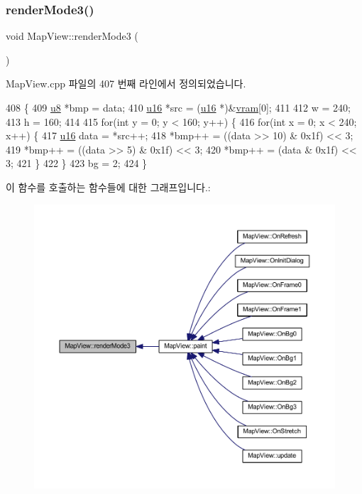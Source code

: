 \subsubsection{\texorpdfstring{render\+Mode3()}{renderMode3()}}
{\footnotesize\ttfamily void Map\+View\+::render\+Mode3 (\begin{DoxyParamCaption}{ }\end{DoxyParamCaption})}



Map\+View.\+cpp 파일의 407 번째 라인에서 정의되었습니다.


\begin{DoxyCode}
408 \{
409   \mbox{\hyperlink{_system_8h_aed742c436da53c1080638ce6ef7d13de}{u8}} *bmp = data;
410   \mbox{\hyperlink{_system_8h_a9e6c91d77e24643b888dbd1a1a590054}{u16}} *src = (\mbox{\hyperlink{_system_8h_a9e6c91d77e24643b888dbd1a1a590054}{u16}} *)&\mbox{\hyperlink{_globals_8cpp_a983f8cd19ae66ea98e180c2e13bee5b9}{vram}}[0];
411 
412   w = 240;
413   h = 160;
414   
415   \textcolor{keywordflow}{for}(\textcolor{keywordtype}{int} y = 0; y < 160; y++) \{
416     \textcolor{keywordflow}{for}(\textcolor{keywordtype}{int} x = 0; x < 240; x++) \{
417       \mbox{\hyperlink{_system_8h_a9e6c91d77e24643b888dbd1a1a590054}{u16}} data = *src++;
418       *bmp++ = ((data >> 10) & 0x1f) << 3;
419       *bmp++ = ((data >> 5) & 0x1f) << 3;
420       *bmp++ = (data & 0x1f) << 3;      
421     \}
422   \}
423   bg = 2;
424 \}
\end{DoxyCode}
이 함수를 호출하는 함수들에 대한 그래프입니다.\+:
\nopagebreak
\begin{figure}[H]
\begin{center}
\leavevmode
\includegraphics[width=350pt]{class_map_view_a554841422c2e7d39ed988017561276b1_icgraph}
\end{center}
\end{figure}
\mbox{\label{class_map_view_a2e10ddf467ef8b43907459790c20016e}} 
